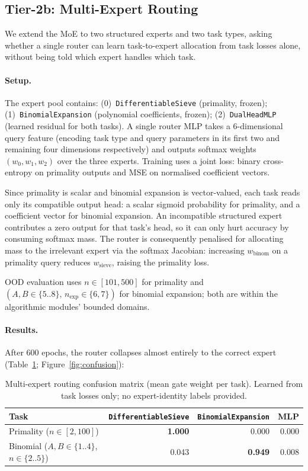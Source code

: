 \documentclass{article}
\begin{document}
\subsection{Tier-2b: Multi-Expert Routing}
\label{sec:tier2b}

We extend the MoE to two structured experts and two task types, asking whether a
single router can learn task-to-expert allocation from task losses alone, without
being told which expert handles which task.

\paragraph{Setup.}
The expert pool contains:
(0)~\texttt{DifferentiableSieve} (primality, frozen);
(1)~\texttt{BinomialExpansion} (polynomial coefficients, frozen);
(2)~\texttt{DualHeadMLP} (learned residual for both tasks).
A single router MLP takes a 6-dimensional query feature (encoding task type and
query parameters in its first two and remaining four dimensions respectively) and
outputs softmax weights $(w_0, w_1, w_2)$ over the three experts.
Training uses a joint loss: binary cross-entropy on primality outputs and MSE on
normalised coefficient vectors.

Since primality is scalar and binomial expansion is vector-valued, each task reads only
its compatible output head: a scalar sigmoid probability for primality, and a coefficient
vector for binomial expansion. An incompatible structured expert contributes a zero
output for that task's head, so it can only hurt accuracy by consuming softmax mass.
The router is consequently penalised for allocating mass to the irrelevant expert via
the softmax Jacobian: increasing $w_\text{binom}$ on a primality query reduces
$w_\text{sieve}$, raising the primality loss.

OOD evaluation uses $n \in [101, 500]$ for primality and $(A, B \in \{5..8\},\,
n_\text{exp} \in \{6, 7\})$ for binomial expansion; both are within the algorithmic
modules' bounded domains.

\paragraph{Results.}
After 600 epochs, the router collapses almost entirely to the correct expert
(Table~\ref{tab:confusion}; Figure~\ref{fig:confusion}):

\begin{table}[h]
  \centering
  \caption{Multi-expert routing confusion matrix (mean gate weight per task).
    Learned from task losses only; no expert-identity labels provided.}
  \label{tab:confusion}
  \small
  \begin{tabular}{lrrr}
    \toprule
    Task & \texttt{DifferentiableSieve} & \texttt{BinomialExpansion} & MLP \\
    \midrule
    Primality ($n \in [2,100]$)                         & \textbf{1.000} & 0.000 & 0.000 \\
    Binomial ($A,B \in \{1..4\}$, $n \in \{2..5\}$)   & 0.043 & \textbf{0.949} & 0.008 \\
    \bottomrule
  \end{tabular}
\end{table}
\end{document}
